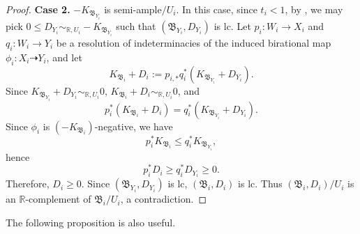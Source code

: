 \documentclass[11pt,reqno]{amsart}
\numberwithin{equation}{section}
\newcommand{\Bb}{{\mathfrak{B}}}
\theoremstyle{definition}
\begin{document}
\begin{proof}
       \medskip

       \noindent\textbf{Case 2.} $-K_{\Bb_{Y_i}}$ is semi-ample$/U_i$. In this case, since $t_i<1$, by \cite[Theorem~3.28]{Cas+25a}, we may pick $0\leq D_{Y_i}\sim_{\mathbb R,U_i}-K_{\Bb_{Y_i}}$ such that $(\Bb_{Y_i},D_{Y_i})$ is lc. Let $p_i: W_i\rightarrow X_i$ and $q_i: W_i\rightarrow Y_i$ be a resolution of indeterminacies of the induced birational map $\phi_i: X_i\dashrightarrow Y_i$, and let 
       $$K_{\Bb_i}+D_i:=p_{i,*}q_i^*(K_{\Bb_{Y_i}}+D_{Y_i}).$$
       Since $K_{\Bb_{Y_i}}+D_{Y_i}\sim_{\mathbb R,U_i}0$, $K_{\Bb_i}+D_i\sim_{\mathbb R,U_i}0$, and
       $$p_i^*(K_{\Bb_i}+D_i)=q_i^*(K_{\Bb_{Y_i}}+D_{Y_i}).$$
       Since $\phi_i$ is $\left(-K_{\Bb_i}\right)$-negative, we have
       $$p_i^*K_{\Bb_i}\leq q_i^*K_{\Bb_{Y_i}},$$
       hence
       $$p_i^*D_i\geq q_i^*D_{Y_i}\geq 0.$$
       Therefore, $D_i\geq 0$. Since $(\Bb_{Y_i},D_{Y_i})$ is lc, $(\Bb_i,D_i)$ is lc. Thus $(\Bb_i,D_i)/U_i$ is an $\mathbb R$-complement of $\Bb_i/U_i$, a contradiction.
\end{proof}

The following proposition is also useful.
\end{document}
